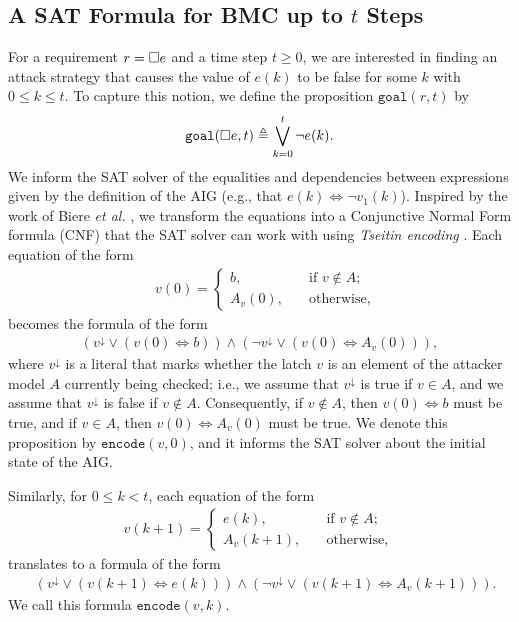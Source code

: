 \subsection{A SAT Formula for BMC up to \texorpdfstring{$t$ Steps}{t Steps}}
For a requirement $r={{\square}} e$ and a time step $t\geq 0$, we are interested in finding an attack strategy that causes the value of $e(k)$ to be false for some $k$ with $0\leq k \leq t$. To capture this notion, we define the proposition $\mathtt{goal}(r,t)$ by
\begin{align}
\mathtt{goal}({{\square}} e,t) \triangleq \bigvee_{k=0}^t{\lnot e(k)}.
\end{align}
We inform the SAT solver of the equalities and dependencies between expressions given by the definition of the AIG (e.g., that $e(k) \Leftrightarrow \lnot v_1(k)$). Inspired by the work of Biere \emph{et al.} \cite{BMCWithoutBDDs}, we transform the equations into a Conjunctive Normal Form formula (CNF) that the SAT solver can work with using  \emph{Tseitin encoding} \cite{TseitinEncoding}. Each equation of the form 
\begin{align*}
&v(0)= \begin{cases}
b, \quad &\text{if $v \not \in A$;}\\
A_v(0), \quad &\text{otherwise,}
\end{cases}
\end{align*}
becomes the formula of the form
\begin{align}
{\left(v^{\downarrow} \lor (v(0) \Leftrightarrow b ) \right)\land \left(\lnot v^{\downarrow} \lor (v(0) \Leftrightarrow A_v(0)) \right)},
\end{align}
where $v^{\downarrow}$ is a literal that marks whether the latch $v$ is an element of the attacker model $A$ currently being checked; i.e., we assume that $v^{\downarrow}$ is true if $v\in A$, and we assume that $v^{\downarrow}$ is false if $v\not \in A$. Consequently, if $v\not \in A$, then $v(0) \Leftrightarrow b$ must be true, and if $v \in A$, then $v(0)  \Leftrightarrow A_v(0) $ must be true. We denote this proposition by $\mathtt{encode}(v,0)$, and it informs the SAT solver about the initial state of the AIG.
 
Similarly, for $0\leq k<t$, each equation of the form 
\begin{align*}
&v(k+1) = \begin{cases}
e(k), \quad &\text{if $v\not \in A$;}\\
A_v(k+1), \quad &\text{otherwise},
\end{cases}\quad
\end{align*}
translates to a formula of the form
\begin{align}
&\left(v^{\downarrow} \lor (v(k+1) \Leftrightarrow e(k) ) \right)\land \left(\lnot v^{\downarrow} \lor (v(k+1) \Leftrightarrow A_v(k+1)) \right).
\end{align}
We call this formula $\mathtt{encode}(v,k)$. %

